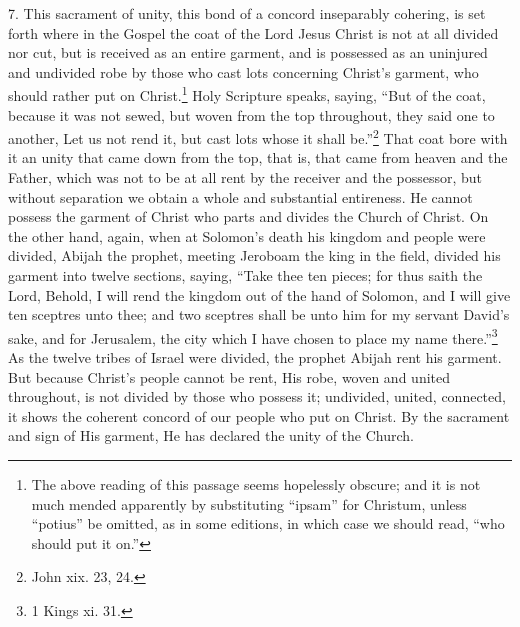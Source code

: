 7. This sacrament of unity, this bond of a concord inseparably cohering, is set forth where in the Gospel the coat of the Lord Jesus Christ is not at all divided nor cut, but is received as an entire garment, and is possessed as an uninjured and undivided robe by those who cast lots concerning Christ’s garment, who should rather put on Christ.\footnote{The above reading of this passage seems hopelessly obscure; and it is not much mended apparently by substituting “ipsam” for Christum, unless “potius” be omitted, as in some editions, in which case we should read, “who should put it on.”} Holy Scripture speaks, saying, “But of the coat, because it was not sewed, but woven from the top throughout, they said one to another, Let us not rend it, but cast lots whose it shall be.”\footnote{John xix. 23, 24.} That coat bore with it an unity that came down from the top, that is, that came from heaven and the Father, which was not to be at all rent by the receiver and the possessor, but without separation we obtain a whole and substantial entireness. He cannot possess the garment of Christ who parts and divides the Church of Christ. On the other hand, again, when at Solomon’s death his kingdom and people were divided, Abijah the prophet, meeting Jeroboam the king in the field, divided his garment into twelve sections, saying, “Take thee ten pieces; for thus saith the Lord, Behold, I will rend the kingdom out of the hand of Solomon, and I will give ten sceptres unto thee; and two sceptres shall be unto him for my servant David’s sake, and for Jerusalem, the city which I have chosen to place my name there.”\footnote{1 Kings xi. 31.} As the twelve tribes of Israel were divided, the prophet Abijah rent his garment. But because Christ’s people cannot be rent, His robe, woven and united throughout, is not divided by those who possess it; undivided, united, connected, it shows the coherent concord of our people who put on Christ. By the sacrament and sign of His garment, He has declared the unity of the Church.

